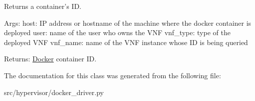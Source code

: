 Returns a container's I\-D. 

Args\-: host\-: I\-P address or hostname of the machine where the docker container is deployed user\-: name of the user who owns the V\-N\-F vnf\-\_\-type\-: type of the deployed V\-N\-F vnf\-\_\-name\-: name of the V\-N\-F instance whose I\-D is being queried

Returns\-: \hyperlink{classhypervisor_1_1docker__driver_1_1Docker}{Docker} container I\-D. 

The documentation for this class was generated from the following file\-:\begin{DoxyCompactItemize}
\item 
src/hypervisor/docker\-\_\-driver.\-py\end{DoxyCompactItemize}
